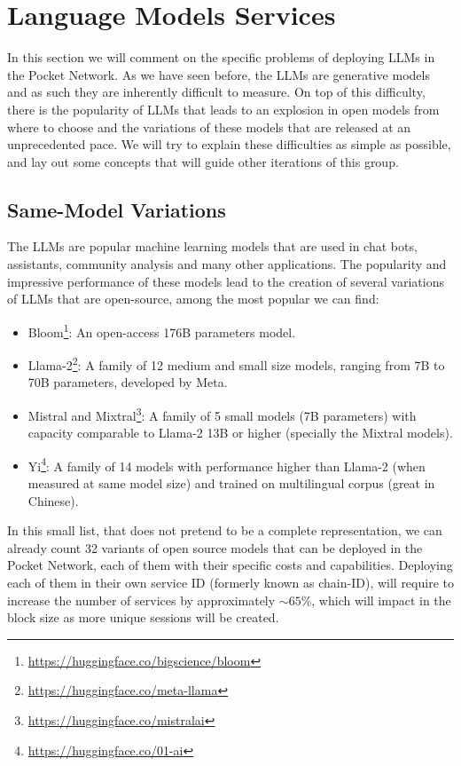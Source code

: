 \section{Language Models Services}\label{sec:ref}
In this section we will comment on the specific problems of deploying LLMs in the Pocket Network. As we have seen before, the LLMs are generative models and as such they are inherently difficult to measure. On top of this difficulty, there is the popularity of LLMs that leads to an explosion in open models from where to choose and the variations of these models that are released at an unprecedented pace. We will try to explain these difficulties as simple as possible, and lay out some concepts that will guide other iterations of this group.

\subsection{Same-Model Variations}
The LLMs are popular machine learning models that are used in chat bots, assistants, community analysis and many other applications. The popularity and impressive performance of these models lead to the creation of several variations of LLMs that are open-source, among the most popular we can find:
\begin{itemize}
    \item Bloom\footnote{\url{https://huggingface.co/bigscience/bloom}}: An open-access 176B parameters model.
    \item Llama-2\footnote{\url{https://huggingface.co/meta-llama}}: A family of 12 medium and small size models, ranging from 7B to 70B parameters, developed by Meta.
    \item Mistral and Mixtral\footnote{\url{https://huggingface.co/mistralai}}: A family of 5 small models (7B parameters) with capacity comparable to Llama-2 13B or higher (specially the Mixtral models).
    \item Yi\footnote{\url{https://huggingface.co/01-ai}}: A family of 14 models with performance higher than Llama-2 (when measured at same model size) and trained on multilingual corpus (great in Chinese).
\end{itemize}
In this small list, that does not pretend to be a complete representation, we can already count 32 variants of open source models that can be deployed in the Pocket Network, each of them with their specific costs and capabilities. Deploying each of them in their own service ID (formerly known as chain-ID), will require to increase the number of services by approximately $\sim65\%$, which will impact in the block size as more unique sessions will be created. 

